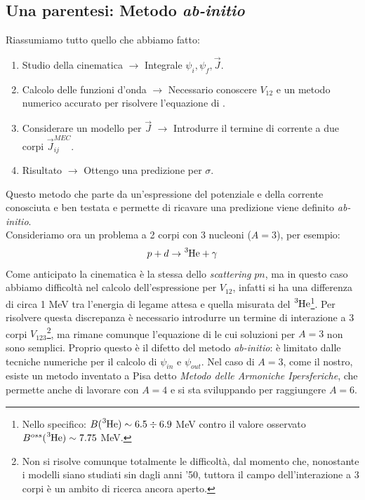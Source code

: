 \subsection{Una parentesi: Metodo \textit{ab-initio}}\label{0318-sec-abinitio} Riassumiamo tutto quello che abbiamo fatto:
\begin{enumerate}[1]
    \item Studio della cinematica $\to$ Integrale $\psi_i,\psi_f,\vec{J}$.
    \item Calcolo delle funzioni d'onda $\to$ Necessario conoscere $V_{12}$ e un metodo numerico accurato per risolvere l'equazione di \Sch.
    \item Considerare un modello  per $\vec{J}$ $\to$ Introdurre il termine di corrente a due corpi $\vec{J}^{MEC}_{ij}$.
    \item Risultato $\to$ Ottengo una predizione per $\sigma$.
\end{enumerate}
Questo metodo che parte da un'espressione del potenziale e della corrente conosciuta e ben testata e permette di ricavare una predizione viene definito \textit{ab-initio}.\\
Consideriamo ora un problema a 2 corpi con 3 nucleoni ($A=3$), per esempio:
$$p+d\to \ce{^3He}+\gamma$$
Come anticipato la cinematica è la stessa dello \textit{scattering} $pn$, ma in questo caso abbiamo difficoltà nel calcolo dell'espressione per $V_{12}$, infatti si ha una differenza di circa 1 MeV tra l'energia di legame attesa e quella misurata del $\ce{^3He}$\footnote{Nello specifico: $B(\ce{^3He})\sim6.5\div 6.9$ MeV contro il valore osservato $B^{oss}(\ce{^3He})\sim7.75$ MeV.%
}. Per risolvere questa discrepanza è necessario introdurre un termine di interazione a 3 corpi $V_{123}$\footnote{Non si risolve comunque totalmente le difficoltà, dal momento che, nonostante i modelli siano studiati sin dagli anni '50, tuttora il campo dell'interazione a 3 corpi è un ambito di ricerca ancora aperto.}, ma rimane comunque l'equazione di \Sch{} le cui soluzioni per $A=3$ non sono semplici. Proprio questo è il difetto del metodo \textit{ab-initio}: è limitato dalle tecniche numeriche per il calcolo di $\psi_{in}$ e $\psi_{out}$. Nel caso di $A=3$, come il nostro, esiste un metodo inventato a Pisa detto \textit{Metodo delle Armoniche Ipersferiche}, che permette anche di lavorare con $A=4$ e si sta sviluppando per raggiungere $A=6$.\\
